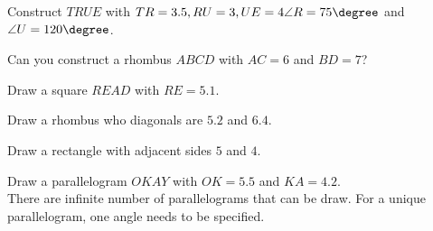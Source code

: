 \item Construct $TRUE$ with $TR = 3.5, RU = 3, UE = 4 \angle R = 75\degree$ and $\angle U = 120\degree$.
\\
\solution 




\item Can you construct a rhombus $ABCD$ with $AC = 6$ and $BD = 7$?
\\
\solution 


\item Draw a square $READ$ with $RE = 5.1$.
\\
\solution 

\item Draw a rhombus who diagonals are $5.2$ and $6.4$.
\\
\solution 


\item Draw a rectangle with adjacent sides $5$ and $4$.
\\
\solution 

\item Draw a parallelogram $OKAY$ with $OK = 5.5$ and $KA = 4.2$.
\\
\solution  There are infinite number of parallelograms that can be draw.  For a unique parallelogram, one angle
needs to be specified.

%
